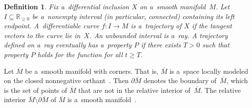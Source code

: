 \documentclass[pdftex]{sigma}
\newtheorem{Definition}[Theorem]{Definition}
\newcommand\ol[1]{{\overline {#1}}}
\begin{document}
\begin{Definition}\label{def:trajectory}
Fix a~dif\/ferential inclusion $X$ on a~smooth manifold~$M$.
Let $I\subseteq\mathbb{R}_{\geq 0}$ be a~nonempty interval (in particular, connected) containing its left endpoint.
A~dif\/fe\-ren\-tiab\-le curve $f:I\to M$ is a~\emph{trajectory} of $X$ if the tangent vectors to the curve lie in~$X$.
An unbounded interval is a~\emph{ray}.
A trajectory def\/ined on a~ray \emph{eventually} has a~property $P$ if there exists $T>0$ such that property $P$ holds
for the function for all $t\geq T$.
\end{Definition}

Let $\ol M$ be a~smooth manifold with corners.
That is, $\ol M$ is a~space locally modeled on the closed nonnegative orthant~\cite[p.~363]{Lee02smooth}.
Then $\partial\ol M$ denotes the boundary of~$\ol M$, which is the set of points of $\ol M$ that are not in the
relative interior of~$\ol M$.
The relative interior $\ol M\setminus\partial\ol M$ of $\ol M$
is a~smooth manifold~\cite[p.~386, Examples~14--19]{Lee02smooth}.
\end{document}
